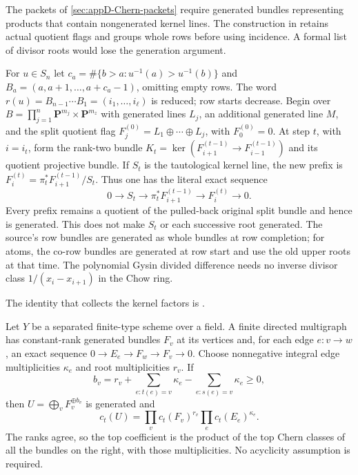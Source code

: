 The packets of \cref{sec:appD-Chern-packets} require generated
bundles representing products that contain nongenerated kernel lines.
The construction in \cite[\S\S3--4]{NguyenDangWang26ChernFlowV4}
retains actual quotient flags and groups whole rows before using
incidence. A formal list of divisor roots would lose the generation
argument.

For $u\in S_n$ let
$c_a=\#\{b>a:u^{-1}(a)>u^{-1}(b)\}$ and
$B_a=(a,a+1,\ldots,a+c_a-1)$, omitting empty rows.
The word $r(u)=B_{n-1}\cdots B_1=(i_1,\ldots,i_\ell)$ is reduced;
row starts decrease. Begin over
$B=\prod_{j=1}^n\mathbf P^{m_j}\times\mathbf P^{m_z}$
with generated lines $L_j$, an additional generated line $M$,
and the split quotient flag $F_j^{(0)}=L_1\oplus\cdots\oplus L_j$,
with $F_0^{(0)}=0$.
At step $t$, with $i=i_t$, form the rank-two bundle
$K_t=\ker(F_{i+1}^{(t-1)}\to F_{i-1}^{(t-1)})$
and its quotient projective bundle. If $S_t$ is the tautological
kernel line, the new prefix is
$F_i^{(t)}=\pi_t^*F_{i+1}^{(t-1)}/S_t$.
Thus one has the literal exact sequence
\[
 0\longrightarrow S_t\longrightarrow
       \pi_t^*F_{i+1}^{(t-1)}\longrightarrow F_i^{(t)}
       \longrightarrow0.
\tag{F.31}\label{eq:appF-Chern-flag-sequence}
\]
Every prefix remains a quotient of the pulled-back original split
bundle and hence is generated. This does not make $S_t$ or each
successive root generated. The source's row bundles are generated
as whole bundles at row completion; for atoms, the co-row bundles
are generated at row start and use the old upper roots at that time.
The polynomial Gysin divided difference needs no inverse divisor
class $1/(x_i-x_{i+1})$ in the Chow ring.

The identity that collects the kernel factors is
\cite[Proposition~4.1]{NguyenDangWang26ChernFlowV4}.
\begin{proposition}
\label{prop:appF-Chern-flow-envelope}
Let $Y$ be a separated finite-type scheme over a field. A finite
directed multigraph has constant-rank generated bundles $F_v$ at
its vertices and, for each edge $e:v\to w$, an exact sequence
$0\to E_e\to F_w\to F_v\to0$. Choose nonnegative integral edge
multiplicities $\kappa_e$ and root multiplicities $r_v$. If
\[
 b_v=r_v+\sum_{e:t(e)=v}\kappa_e
              -\sum_{e:s(e)=v}\kappa_e\geq0,
\tag{F.32}\label{eq:appF-Chern-divergence}
\]
then $U=\bigoplus_v F_v^{\oplus b_v}$ is generated and
\[
 c_t(U)=\prod_v c_t(F_v)^{r_v}\prod_e c_t(E_e)^{\kappa_e}.
\tag{F.33}\label{eq:appF-Chern-flow-class}
\]
The ranks agree, so the top coefficient is the product of the
top Chern classes of all the bundles on the right, with those
multiplicities. No acyclicity assumption is required.
\end{proposition}

